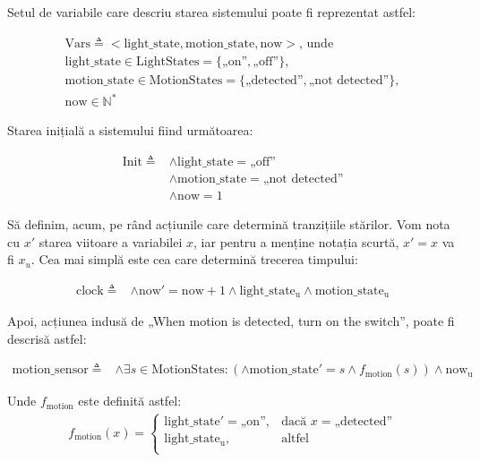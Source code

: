 Setul de variabile care descriu starea sistemului poate fi reprezentat astfel:

\begin{gather*}
    \mathrm{Vars} \triangleq <\mathrm{light\_state}, \mathrm{motion\_state}, \mathrm{now}> \text{, unde } \\
        \mathrm{light\_state} \in \mathrm{LightStates} = \{\text{„on”}, \text{„off”}\}, \\
        \mathrm{motion\_state} \in \mathrm{MotionStates} = \{\text{„detected”}, \text{„not detected”}\}, \\
        \mathrm{now} \in \mathbb{N}^*
\end{gather*}

Starea inițială a sistemului fiind următoarea:

\begin{align*}
    \mathrm{Init} \triangleq &\wedge \mathrm{light\_state} = \text{„off”} \\
                   &\wedge \mathrm{motion\_state} = \text{„not detected”} \\
                   &\wedge \mathrm{now} = 1
\end{align*}

Să definim, acum, pe rând acțiunile care determină tranzițiile stărilor. Vom nota cu $x'$ starea viitoare a variabilei $x$, iar pentru a menține notația scurtă, $x' = x$ va fi $x_u$. Cea mai simplă este cea care determină trecerea timpului:

\begin{align*}
    \mathrm{clock} \triangleq &\wedge \mathrm{now'} = \mathrm{now} + 1 \wedge \mathrm{light\_state_u} \wedge \mathrm{motion\_state_u}
\end{align*}

Apoi, acțiunea indusă de „When motion is detected, turn on the switch”, poate fi descrisă astfel:

\begin{align*}
    \mathrm{motion\_sensor} \triangleq &\wedge \exists s \in \mathrm{MotionStates} : (
        \wedge \mathrm{motion\_state'} = s \wedge f_{\mathrm{motion}}(s)
    ) \wedge \mathrm{now_u}
\end{align*}

Unde $f_{\mathrm{motion}}$ este definită astfel:
\begin{gather*}
    f_{\mathrm{motion}}(x) = \left\{
        \begin{array}{ll}
              \mathrm{light\_state'} = \text{„on”}, & \text{dacă } x = \text{„detected”} \\
              \mathrm{light\_state_u}, & \text{altfel} \\
        \end{array} 
        \right. 
\end{gather*}

